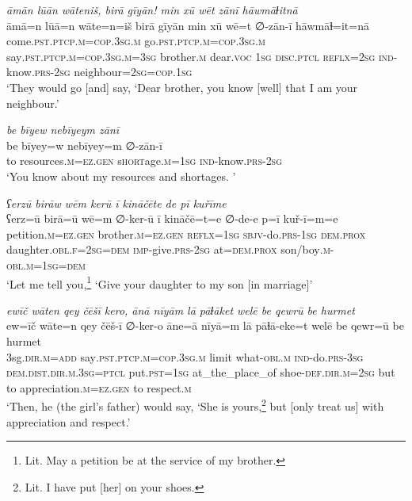 \ea \label{RE.5}
\textit{āmān lūān wāteniš, birā gīyān! min xū wēt zānī hāwmāɫitnā} \\ 
\gll āmā=n lūā=n wāte=n=iš birā gīyān min xū wē=t ∅-zān-ī hāwmāɫ=it=nā \\ 
 come\textsc{.pst}\textsc{.ptcp}\textsc{.m}\textsc{=cop}\textsc{.3sg}\textsc{.m} go\textsc{.pst}\textsc{.ptcp}\textsc{.m}\textsc{=cop}\textsc{.3sg}\textsc{.m} say\textsc{.pst}\textsc{.ptcp}\textsc{.m}\textsc{=cop}\textsc{.3sg}\textsc{.m}\textsc{=3sg} brother\textsc{.m} dear.\textsc{voc} \textsc{1sg} \textsc{disc.ptcl} \textsc{reflx}\textsc{=\textsc{2sg}} \textsc{ind-}know\textsc{.prs}-\textsc{2sg} neighbour\textsc{=\textsc{2sg}}\textsc{=cop}\textsc{.\textsc{1sg}} \\ 
\glt `They would go [and] say, ‘Dear brother, you know [well] that I am your neighbour.'
\z 
 
\ea \label{RE.6}
\textit{be bīyew nebīyeym zānī} \\ 
\gll be bīyey=w nebīyey=m ∅-zān-ī \\ 
 to resources\textsc{.m}\textsc{\textsc{=ez.gen}} s\textsc{hort}age\textsc{.m}\textsc{=\textsc{1sg}} \textsc{ind-}know\textsc{.prs}-\textsc{2sg} \\ 
\glt `You know about my resources and shortages. '
\z 
 
\ea \label{RE.7}
\textit{ʕerzū birāw wēm kerū ī kināčēte de pī kuřīme} \\ 
\gll ʕerz=ū birā=ū wē=m ∅-ker-ū ī kināčē=t=e ∅-de-e p=ī kuř-ī=m=e \\ 
 petition\textsc{.m}\textsc{\textsc{=ez.gen}} brother\textsc{.m}\textsc{\textsc{=ez.gen}} \textsc{reflx}\textsc{=\textsc{1sg}} \textsc{sbjv-}do\textsc{.prs}\textsc{-\textsc{1sg}} \textsc{dem.prox} daughter\textsc{.obl}\textsc{.f}\textsc{=\textsc{2sg}}\textsc{=dem} \textsc{imp-}give\textsc{.prs}-\textsc{2sg} at=\textsc{dem.prox} son/boy\textsc{.m}\textsc{-obl}\textsc{.m}\textsc{=\textsc{1sg}}\textsc{=dem} \\ 
\glt `Let me tell you,\footnote{Lit. May a petition be at the service of my brother.} ‘Give your daughter to my son [in marriage]'
\z 
 
\ea \label{RE.10}
\textit{ewīč wāten qey čēšī kero, ānā nīyām lā pāɫāket welē be qewrū be hurmet} \\ 
\gll ew=īč wāte=n qey čēš-ī ∅-ker-o āne=ā nīyā=m lā pāɫā-eke=t welē be qewr=ū be hurmet \\ 
 3sg\textsc{.dir}\textsc{.m}\textsc{=add} say\textsc{.pst}\textsc{.ptcp}\textsc{.m}\textsc{=cop}\textsc{.3sg}\textsc{.m} limit what\textsc{-obl}\textsc{.m} \textsc{ind-}do\textsc{.prs}\textsc{-3sg} \textsc{dem.dist}\textsc{.dir}\textsc{.m}\textsc{.3sg}=\textsc{ptcl} put\textsc{.pst}\textsc{=\textsc{1sg}} at\_the\_place\_of shoe\textsc{-def}\textsc{.dir}\textsc{.m}\textsc{=\textsc{2sg}} but to appreciation\textsc{.m}\textsc{\textsc{=ez.gen}} to respect\textsc{.m} \\ 
\glt `Then, he (the girl’s father) would say, ‘She is yours,\footnote{Lit. I have put [her] on your shoes.} but [only treat us] with appreciation and respect.'
\z 
 
